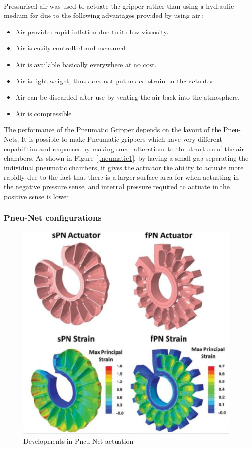 \documentclass[11pt,twocolumn]{article}
\begin{document}
\\
\newline
Pressurised air was used to actuate the gripper rather than using a hydraulic medium for due to the following advantages provided by using air \cite{mosadegh2014pneumatic}:
\begin{itemize}
\item Air provides rapid inflation due to its low viscosity.
\item Air is easily controlled and measured.
\item Air is available basically everywhere at no cost.
\item Air is light weight, thus does not put added strain on the actuator.
\item Air can be discarded after use by venting the air back into the atmosphere.
\item Air is compressible
\\
\newline
\end{itemize}
The performance of the Pneumatic Gripper depends on the layout of the Pneu-Nets. It is possible to make Pneumatic grippers which have very different capabilities and responses by making small alterations to the structure of the air chambers. As shown in Figure \ref{pneumatic1}, by having a small gap separating the individual pneumatic chambers, it gives the actuator the ability to actuate more rapidly due to the fact that there is a larger surface area for when actuating in the negative pressure sense, and internal pressure required to actuate in the positive sense is lower \cite{mosadegh2014pneumatic}.
\subsubsection{Pneu-Net configurations}
\begin{figure}[h]
\centering
\includegraphics[scale=0.65]{Pneumatic2}
\caption{Developments in Pneu-Net actuation}
\label{fig:Pneumatic2}
\end{figure}
\end{document}
